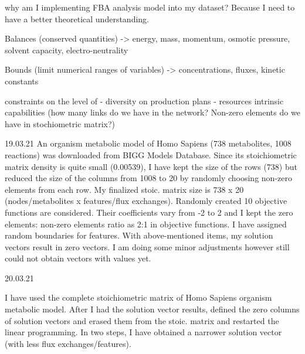 why am I implementing FBA analysis model into my dataset?
Because I need to have a better theoretical understanding.

Balances (conserved quantities) -> energy, mass, momentum, osmotic pressure, solvent capacity, electro-neutrality

Bounds (limit numerical ranges of variables) -> concentrations, fluxes, kinetic constants

constraints on the level of - diversity on production plans
							- resources
							intrinsic capabilities (how many links do we have in the network? Non-zero elements do we have in stochiometric matrix?)

19.03.21
An organism metabolic model of Homo Sapiens (738 metabolites, 1008 reactions) was downloaded from BIGG Models Database. Since its stoichiometric matrix density is quite small (0.00539), I have kept the size of the rows (738) but reduced the size of the columns from 1008 to 20 by randomly choosing non-zero elements from each row. My finalized stoic. matrix size is 738 x 20 (nodes/metabolites x features/flux exchanges).
Randomly created 10 objective functions are considered. Their coefficients vary from -2 to 2 and I kept the zero elements: non-zero elements ratio as 2:1 in objective functions.
I have assigned random boundaries for features.
With above-mentioned items, my solution vectors result in zero vectors. I am doing some minor adjustments however still could not obtain vectors with values yet.

20.03.21

I have used the complete stoichiometric matrix of Homo Sapiens organism metabolic model. After I had the solution vector results, defined the zero columns of solution vectors and erased them from the stoic. matrix and restarted the linear programming. In two steps, I have obtained a narrower solution vector (with less flux exchanges/features).
